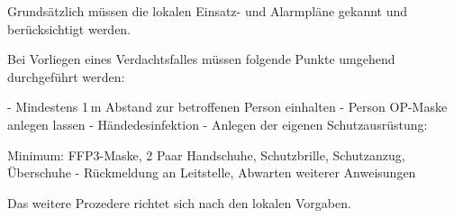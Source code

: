 %
Grundsätzlich müssen die lokalen Einsatz-
und Alarmpläne gekannt und berücksichtigt werden.

Bei Vorliegen eines Verdachtsfalles müssen folgende Punkte umgehend durchgeführt werden:
\begin{itemize}
  -   Mindestens 1 m Abstand zur betroffenen Person einhalten
  -   Person OP-Maske anlegen lassen
  -   Händedesinfektion
  -   Anlegen der eigenen Schutzausrüstung: 
  
  Minimum: FFP3-Maske, 2 Paar Handschuhe, Schutzbrille, Schutzanzug, Überschuhe
  -   Rückmeldung an Leitstelle, Abwarten weiterer Anweisungen
\end{itemize}

Das weitere Prozedere richtet sich nach den lokalen Vorgaben.
